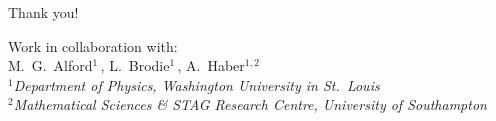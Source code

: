 \documentclass{beamer}
\begin{document}
\begin{frame}
\vspace{1.5em}
\Huge{\centerline{Thank you!}}
\vspace{1.5em}

{\normalsize
\begin{center}
{Work in collaboration with:}\\[0.5em]
M.~G.~Alford$^{1}$\,,\quad
L.~Brodie$^{1}$\,,\quad
A.~Haber$^{1,2}$\\
\vspace{0.8em}
{\small\it $^1$Department of Physics, Washington University in St.\ Louis}\\
{\small\it $^2$Mathematical Sciences \& STAG Research Centre, University of Southampton}\\
\end{center}
}

\end{frame}




\end{document}
